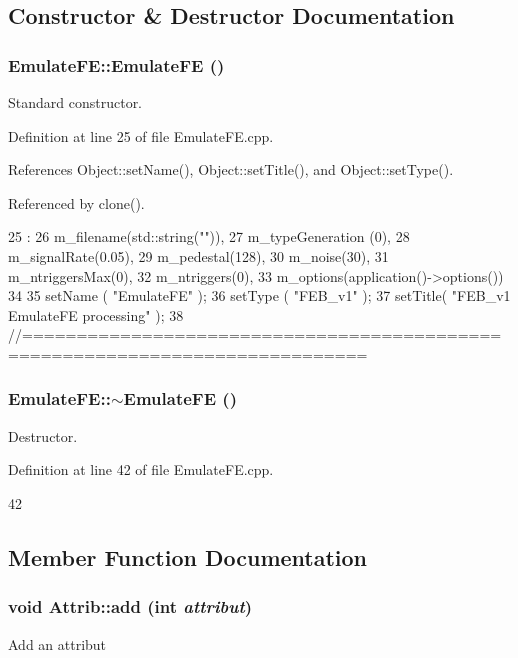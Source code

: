 \subsection{Constructor \& Destructor Documentation}
\hypertarget{classEmulateFE_ac6242fca0d5c30477153d1d33d5f990d}{
\subsubsection[{EmulateFE}]{\setlength{\rightskip}{0pt plus 5cm}EmulateFE::EmulateFE ()}}
\label{classEmulateFE_ac6242fca0d5c30477153d1d33d5f990d}


Standard constructor. 

Definition at line 25 of file EmulateFE.cpp.

References Object::setName(), Object::setTitle(), and Object::setType().

Referenced by clone().


\begin{DoxyCode}
25                        :
26   m_filename(std::string("")),
27   m_typeGeneration (0),
28   m_signalRate(0.05),
29   m_pedestal(128),
30   m_noise(30),
31   m_ntriggersMax(0),
32   m_ntriggers(0),
33   m_options(application()->options())
34 {
35   setName ( "EmulateFE" );
36   setType ( "FEB_v1" );
37   setTitle( "FEB_v1 EmulateFE processing" );
38 }
//=============================================================================
\end{DoxyCode}
\hypertarget{classEmulateFE_ab0ae9c65e546ec89bb0d6d318428d578}{
\subsubsection[{$\sim$EmulateFE}]{\setlength{\rightskip}{0pt plus 5cm}EmulateFE::$\sim$EmulateFE ()}}
\label{classEmulateFE_ab0ae9c65e546ec89bb0d6d318428d578}


Destructor. 

Definition at line 42 of file EmulateFE.cpp.


\begin{DoxyCode}
42 {}
\end{DoxyCode}


\subsection{Member Function Documentation}
\hypertarget{classAttrib_a235f773af19c900264a190b00a3b4ad7}{
\subsubsection[{add}]{\setlength{\rightskip}{0pt plus 5cm}void Attrib::add (int {\em attribut})}}
\label{classAttrib_a235f773af19c900264a190b00a3b4ad7}
Add an attribut 

